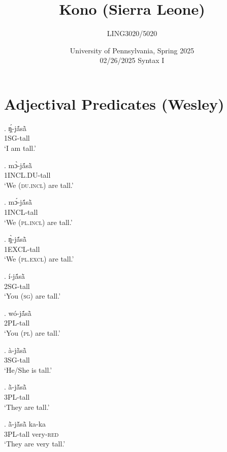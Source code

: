 \documentclass{assets/fieldnotes}
\title{Kono (Sierra Leone)}
\author{LING3020/5020}
\date{University of Pennsylvania, Spring 2025\\02/26/2025 Syntax I}
\begin{document}
\maketitle
\tableofcontents


\section{Adjectival Predicates (Wesley)}


\exg. ŋ̩́-jã́sã̀\\
\textsc{1SG}-tall\\
`I am tall.’

\exg. mɔ̀-jã́sã̀\\
\textsc{1INCL.DU}-tall\\
`We (\textsc{du.incl}) are tall.’

\exg. mɔ́-jã́sã̀\\
\textsc{1INCL}-tall\\
`We (\textsc{pl.incl}) are tall.’

\exg. ŋ̩̀-jã́sã̀\\
\textsc{1EXCL}-tall\\
`We (\textsc{pl.excl}) are tall.’

\exg. í-jã́sã̀\\
\textsc{2SG}-tall\\
`You (\textsc{sg}) are tall.’

\exg. wó-jã́sã̀\\
\textsc{2PL}-tall\\
`You (\textsc{pl}) are tall.’

\exg. à-jã̀sã̀\\
\textsc{3SG}-tall\\
`He/She is tall.’

\exg. ã̀-jã̌sã̀\\
\textsc{3PL}-tall\\
`They are tall.’

\exg. ã̀-jã̌sã̀ ka-ka\\
\textsc{3PL}-tall very-\textsc{red}\\
`They are very tall.’

\end{document}
